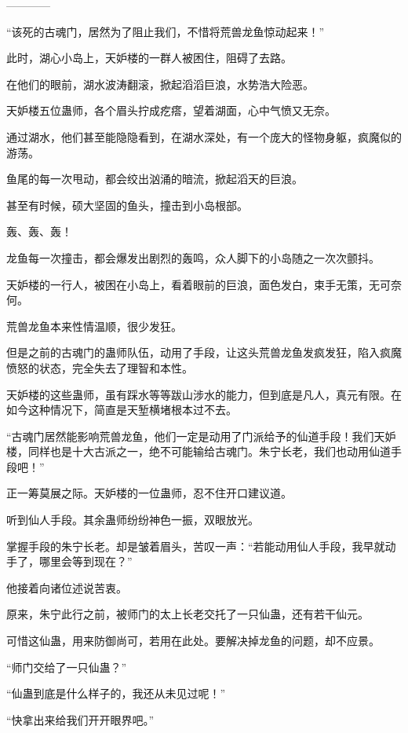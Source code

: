 
\begin{this_body}

------------

“该死的古魂门，居然为了阻止我们，不惜将荒兽龙鱼惊动起来！”

此时，湖心小岛上，天妒楼的一群人被困住，阻碍了去路。

在他们的眼前，湖水波涛翻滚，掀起滔滔巨浪，水势浩大险恶。

天妒楼五位蛊师，各个眉头拧成疙瘩，望着湖面，心中气愤又无奈。

通过湖水，他们甚至能隐隐看到，在湖水深处，有一个庞大的怪物身躯，疯魔似的游荡。

鱼尾的每一次甩动，都会绞出汹涌的暗流，掀起滔天的巨浪。

甚至有时候，硕大坚固的鱼头，撞击到小岛根部。

轰、轰、轰！

龙鱼每一次撞击，都会爆发出剧烈的轰鸣，众人脚下的小岛随之一次次颤抖。

天妒楼的一行人，被困在小岛上，看着眼前的巨浪，面色发白，束手无策，无可奈何。

荒兽龙鱼本来性情温顺，很少发狂。

但是之前的古魂门的蛊师队伍，动用了手段，让这头荒兽龙鱼发疯发狂，陷入疯魔愤怒的状态，完全失去了理智和本性。

天妒楼的这些蛊师，虽有踩水等等跋山涉水的能力，但到底是凡人，真元有限。在如今这种情况下，简直是天堑横堵根本过不去。

“古魂门居然能影响荒兽龙鱼，他们一定是动用了门派给予的仙道手段！我们天妒楼，同样也是十大古派之一，绝不可能输给古魂门。朱宁长老，我们也动用仙道手段吧！”

正一筹莫展之际。天妒楼的一位蛊师，忍不住开口建议道。

听到仙人手段。其余蛊师纷纷神色一振，双眼放光。

掌握手段的朱宁长老。却是皱着眉头，苦叹一声：“若能动用仙人手段，我早就动手了，哪里会等到现在？”

他接着向诸位述说苦衷。

原来，朱宁此行之前，被师门的太上长老交托了一只仙蛊，还有若干仙元。

可惜这仙蛊，用来防御尚可，若用在此处。要解决掉龙鱼的问题，却不应景。

“师门交给了一只仙蛊？”

“仙蛊到底是什么样子的，我还从未见过呢！”

“快拿出来给我们开开眼界吧。”


\end{this_body}
